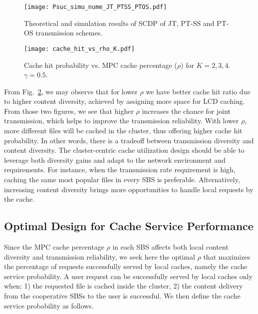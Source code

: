 \documentclass[twocolumns,10pt]{IEEEtran}
\begin{document}
\begin{figure}
	\centering
	\texttt{[image: Psuc\_simu\_nume\_JT\_PTSS\_PTOS.pdf]}
	\caption{Theoretical and simulation results of SCDP of JT, PT-SS and PT-OS transmission schemes.}
	\label{Psuc_JT_PT}
\end{figure}

\begin{figure}
	\centering
	\texttt{[image: cache\_hit\_vs\_rho\_K.pdf]}
	\caption{Cache hit probability vs. MPC cache percentage ($\rho$) for $K=2, 3, 4$. $\gamma=0.5$.}
	\label{Cache_hit}
\end{figure}

From Fig.~\ref{Cache_hit}, we may observe that for lower $\rho$ we have better cache hit ratio due to higher content diversity, achieved by assigning more space for LCD caching.
From those two figures, we see that higher $\rho$ increases the chance for joint transmission, which helps to improve the transmission reliability. With lower $\rho$, more different files will be cached in the cluster, thus offering higher cache hit probability.  
In other words, there is a tradeoff between transmission diversity and content diversity. The cluster-centric cache utilization design should be able to leverage both diversity gains and adapt to the network environment and requirements. For instance,
when the transmission rate requirement is high, caching the same most popular files in every SBS is preferable. Alternatively, increasing content diversity brings more opportunities to handle local requests by the cache. 


\subsection{Optimal Design for Cache Service Performance }
\label{cache_service_optimization}
Since the MPC cache percentage $\rho$ in each SBS affects both local content diversity and transmission reliability, we seek here the optimal $\rho$ that maximizes the percentage of requests successfully served by local caches, namely the cache service probability. A user request can be successfully served by local caches only when: 1) the requested file is cached inside the cluster, 2) the content delivery from the cooperative SBSs to the user is successful. We then define the cache service probability as follows.
\end{document}
